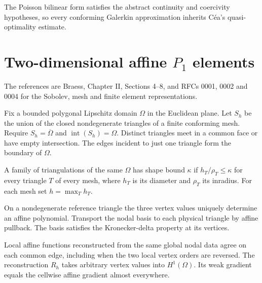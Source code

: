 \begin{proposition}
  \label{prop:poisson-galerkin-cea}
  \notready
  The Poisson bilinear form satisfies the abstract continuity and coercivity
  hypotheses, so every conforming Galerkin approximation inherits Céa's
  quasi-optimality estimate.
\end{proposition}

\chapter{Two-dimensional affine $P_1$ elements}

The references are Braess, Chapter II, Sections 4--8, and RFCs 0001, 0002
and 0004 for the Sobolev, mesh and finite element representations.

\begin{definition}
  \label{def:fixed-domain-triangulation}
  \notready
  Fix a bounded polygonal Lipschitz domain $\Omega$ in the Euclidean plane.
  Let $S_h$ be the union of the closed nondegenerate triangles of a finite
  conforming mesh. Require $S_h=\overline{\Omega}$ and
  $\operatorname{int}(S_h)=\Omega$. Distinct triangles meet in a common
  face or have empty intersection. The edges incident to just one triangle
  form the boundary of $\Omega$.
\end{definition}

\begin{definition}
  \label{def:shape-regular-mesh-family}
  \notready
  A family of triangulations of the same $\Omega$ has shape bound $\kappa$
  if $h_T/\rho_T\le\kappa$ for every triangle $T$ of every mesh, where
  $h_T$ is its diameter and $\rho_T$ its inradius. For each mesh set
  $h=\max_T h_T$.
\end{definition}

\begin{definition}
  \label{def:affine-p1}
  \notready
  On a nondegenerate reference triangle the three vertex values uniquely
  determine an affine polynomial. Transport the nodal basis to each physical
  triangle by affine pullback. The basis satisfies the Kronecker-delta
  property at its vertices.
\end{definition}

\begin{proposition}[$P_1$ conformity]
  \label{prop:p1-conformity}
  \notready
  Local affine functions reconstructed from the same global nodal data agree
  on each common edge, including when the two local vertex orders are reversed.
  The reconstruction $R_h$ takes arbitrary vertex values into $H^1(\Omega)$.
  Its weak gradient equals the cellwise affine gradient almost everywhere.
\end{proposition}

